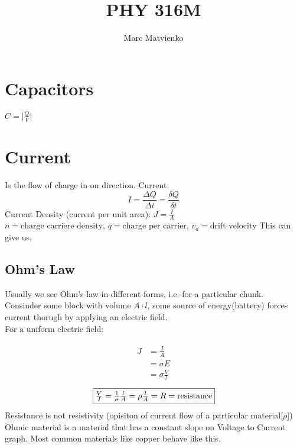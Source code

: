\documentclass{article}
\title{PHY 316M}
\author{Marc Matvienko}
\begin{document}
    \maketitle %
    
    \section{Capacitors}
    $C = \lvert\frac{Q}{V}\rvert$

    \section{Current}
    Is the flow of charge in on direction.
    Current: $$I=\frac{\Delta Q}{\Delta t} =\frac{\delta Q}{\delta t}$$
    Current Density (current per unit area): $J = \frac{I}{A}$\\
    $n = \text{charge carriere density}$, $q = \text{charge per carrier}$, $v_d = \text{drift velocity}$
    This can give us, 
    
    \subsection{Ohm's Law}
    Usually we see Ohm's law in different forms, i.e. for a particular chunk.\\
    Consinder some block with volume $A \cdot l$, some source of energy(battery) forces current thorugh by applying an electric field.\\
    For a uniform electric field: 
    
    \begin{align*}
        \begin{split}
            J &= \frac{I}{A} \\
            &= \sigma E \\
            &= \sigma \frac{V}{l}
        \end{split}
    \end{align*}
    $$\boxed{$$\frac{V}{I} = \frac{1}{\sigma} \frac{l}{A} = \rho \frac{l}{A} = R = \text{resistance}$$}$$
    Resistance is not resistivity (opisiton of current flow of a particular material[$\rho$])
    Ohmic material is a material that has a constant slope on Voltage to Current graph. Most common materials like copper behave like this.
\end{document}
